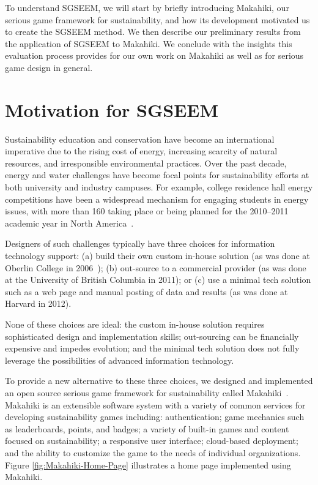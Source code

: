 \documentclass{sigchi}
\begin{document}
To understand SGSEEM, we will start by briefly introducing Makahiki, our serious game
framework for sustainability, and how its development motivated us to create the SGSEEM
method. We then describe our preliminary results from the application of SGSEEM to
Makahiki. We conclude with the insights this evaluation process provides for our own work
on Makahiki as well as for serious game design in general.


\section{Motivation for SGSEEM}

Sustainability education and conservation have become an international
imperative due to the rising cost of energy, increasing scarcity of
natural resources, and irresponsible environmental practices. Over the
past decade, energy and water challenges have become focal
points for sustainability efforts at both university and industry
campuses. For example, college residence hall energy competitions have
been a widespread mechanism for engaging students in energy issues,
with more than 160 taking place or being planned for the 2010--2011
academic year in North America~\cite{Hodge2010}.

Designers of such challenges typically have three choices for
information technology support: (a) build their own custom in-house
solution (as was done at Oberlin College in
2006~\cite{petersen-dorm-energy-reduction}); (b) out-source to a
commercial provider (as was done at the University of British Columbia
in 2011); or (c) use a minimal tech solution such as a web page and
manual posting of data and results (as was done at Harvard in 2012).

None of these choices are ideal: the custom in-house solution requires
sophisticated design and implementation skills; out-sourcing can be
financially expensive and impedes evolution; and the minimal tech
solution does not fully leverage the possibilities of advanced
information technology.

To provide a new alternative to these three choices, we designed and implemented
an open source serious game framework for sustainability called
Makahiki~\cite{csdl2-12-06}.  Makahiki is an extensible software system with a variety
of common services for developing sustainability games including: authentication; game
mechanics such as leaderboards, points, and badges; a variety of built-in games and
content focused on sustainability; a responsive user interface; cloud-based deployment;
and the ability to customize the game to the needs of individual organizations.  
Figure \ref{fig:Makahiki-Home-Page} illustrates a home page implemented using Makahiki.
\end{document}
